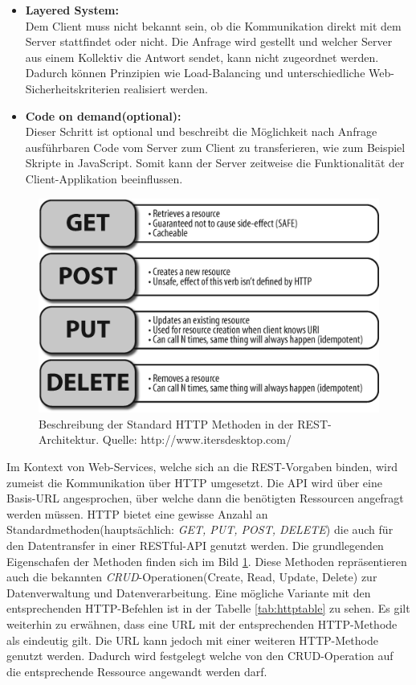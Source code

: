 \documentclass[fleqn,10pt,ngerman]{SelfArx}
\begin{document}
\begin{itemize}
	\item \textbf{Layered System:}\\ Dem Client muss nicht bekannt sein, ob die Kommunikation direkt mit dem Server stattfindet oder nicht. Die Anfrage wird gestellt und welcher Server aus einem Kollektiv die Antwort sendet, kann nicht zugeordnet werden. Dadurch können Prinzipien wie Load-Balancing und unterschiedliche Web-Sicherheitskriterien realisiert werden. 
	\item \textbf{Code on demand(optional):}\\ Dieser Schritt ist optional und beschreibt die Möglichkeit nach Anfrage ausführbaren Code vom Server zum Client zu transferieren, wie zum Beispiel Skripte in JavaScript. Somit kann der Server zeitweise die Funktionalität der Client-Applikation beeinflussen.
\end{itemize} 

\begin{figure}[ht]\centering
	\includegraphics[width=8.5 cm]{Abbildungen/RESTful-operations}
	\caption{Beschreibung der Standard HTTP Methoden in der REST-Architektur. Quelle: http://www.itersdesktop.com/}
	\label{fig:restCalls}
\end{figure}

Im Kontext von Web-Services, welche sich an die REST-Vorgaben binden, wird zumeist die Kommunikation über HTTP umgesetzt. Die API wird über eine Basis-URL angesprochen, über welche dann die benötigten Ressourcen angefragt werden müssen. HTTP bietet eine gewisse Anzahl an Standardmethoden(hauptsächlich: \textit{GET, PUT, POST, DELETE}) die auch für den Datentransfer in einer RESTful-API genutzt werden. Die grundlegenden Eigenschafen der Methoden finden sich im Bild \ref{fig:restCalls}. Diese Methoden repräsentieren auch die bekannten \textit{CRUD}-Operationen(Create, Read, Update, Delete) zur Datenverwaltung und Datenverarbeitung. Eine mögliche Variante mit den entsprechenden HTTP-Befehlen ist in der Tabelle \ref{tab:httptable} zu sehen. Es gilt weiterhin zu erwähnen, dass eine URL mit der entsprechenden HTTP-Methode als eindeutig gilt. Die URL kann jedoch mit einer weiteren HTTP-Methode genutzt werden. Dadurch wird festgelegt welche von den CRUD-Operation auf die entsprechende Ressource angewandt werden darf. 
\end{document}

